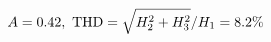 \documentclass[preview]{standalone}
\begin{document}
\begin{align*}
\special{dvisvgm:raw <g id='unique000'>}A=0.42,\ \text{THD}=\sqrt{H_2^2+H_3^2}/H_1=8.2\%\special{dvisvgm:raw </g>}
\end{align*}
\end{document}
